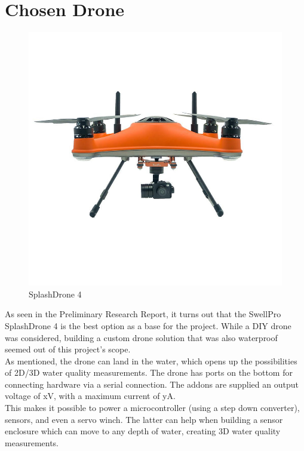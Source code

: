 \newpage
\section{Chosen Drone}
\begin{figure}
\includegraphics[width=1\linewidth]{21_splashdrone4.png}
\caption{SplashDrone 4}
\end{figure}
As seen in the Preliminary Research Report, \cite{prr} it turns out that the SwellPro SplashDrone 4 is the best option as a base for the project. While a DIY drone was considered, building a custom drone solution that was also waterproof seemed out of this project's scope.\\

As mentioned, the drone can land in the water, which opens up the possibilities of 2D/3D water quality measurements. The drone has ports on the bottom for connecting hardware via a serial connection. The addons are supplied an output voltage of xV, with a maximum current of yA. \\

This makes it possible to power a microcontroller (using a step down converter), sensors, and even a servo winch. The latter can help when building a sensor enclosure which can move to any depth of water, creating 3D water quality measurements.

